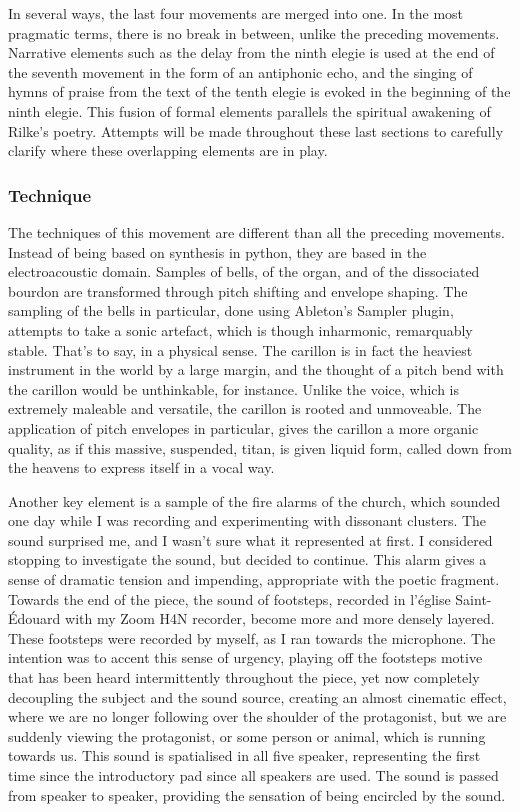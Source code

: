 \documentclass[12pt,twoside,maitrise]{dms}
\theoremstyle{definition}
\begin{document}
In several ways, the last four movements are merged into one.
In the most pragmatic terms, there is no break in between, unlike the preceding movements.
Narrative elements such as the delay from the ninth elegie is used at the end of the seventh movement in the form of an antiphonic echo, and the singing of hymns of praise from the text of the tenth elegie is evoked in the beginning of the ninth elegie.
This fusion of formal elements parallels the spiritual awakening of Rilke's poetry.
Attempts will be made throughout these last sections to carefully clarify where these overlapping elements are in play.

\subsubsection{Technique}

The techniques of this movement are different than all the preceding movements.
Instead of being based on synthesis in python, they are based in the electroacoustic domain.
Samples of bells, of the organ, and of the dissociated bourdon are transformed through pitch shifting and envelope shaping.
The sampling of the bells in particular, done using Ableton's Sampler plugin, attempts to take a sonic artefact, which is though inharmonic, remarquably stable.
That's to say, in a physical sense.
The carillon is in fact the heaviest instrument in the world by a large margin, and the thought of a pitch bend with the carillon would be unthinkable, for instance.
Unlike the voice, which is extremely maleable and versatile, the carillon is rooted and unmoveable.
The application of pitch envelopes in particular, gives the carillon a more organic quality, as if this massive, suspended, titan, is given liquid form, called down from the heavens to express itself in a vocal way.

Another key element is a sample of the fire alarms of the church, which sounded one day while I was recording and experimenting with dissonant clusters.
The sound surprised me, and I wasn’t sure what it represented at first.
I considered stopping to investigate the sound, but decided to continue.
This alarm gives a sense of dramatic tension and impending, appropriate with the poetic fragment.
Towards the end of the piece, the sound of footsteps, recorded in l'église Saint-Édouard with my Zoom H4N recorder, become more and more densely layered.
These footsteps were recorded by myself, as I ran towards the microphone.
The intention was to accent this sense of urgency, playing off the footsteps motive that has been heard intermittently throughout the piece, yet now completely decoupling the subject and the sound source, creating an almost cinematic effect, where we are no longer following over the shoulder of the protagonist, but we are suddenly viewing the protagonist, or some person or animal, which is running towards us.
This sound is spatialised in all five speaker, representing the first time since the introductory pad since all speakers are used.
The sound is passed from speaker to speaker, providing the sensation of being encircled by the sound.
\end{document}
